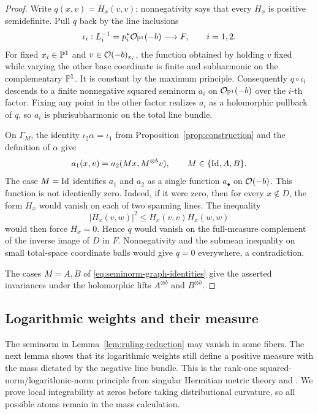 \begin{proof}
Write
$q(x,v)=H_x(v,v)$; nonnegativity says that every $H_x$ is positive
semidefinite.  Pull $q$ back by the line inclusions
\[
 \iota_i:L_i^{-1}=p_i^*\mathcal O_{\mathbb P^1}(-b)\longrightarrow F,
 \qquad i=1,2.
\]
For fixed $x_i\in\mathbb P^1$ and $v\in\mathcal O(-b)_{x_i}$, the function obtained
by holding $v$ fixed while varying the other base coordinate is finite
and subharmonic on the complementary $\mathbb P^1$.  It is constant by the
maximum principle.  Consequently $q\circ\iota_i$ descends to a finite
nonnegative squared seminorm $a_i$ on $\mathcal O_{\mathbb P^1}(-b)$ over the
$i$-th factor.  Fixing any point in the other factor realizes $a_i$ as a
holomorphic pullback of $q$, so $a_i$ is plurisubharmonic on the total
line bundle.

On $\Gamma_M$, the identity $\iota_2\alpha=\iota_1$ from
Proposition~\ref{prop:construction} and the definition of $\alpha$ give
\begin{equation}
 \label{eq:seminorm-graph-identities}
 a_1(x,v)=a_2(Mx,M^{\otimes b}v),
 \qquad M\in\{\operatorname{Id},A,B\}.
\end{equation}
The case $M=\operatorname{Id}$ identifies $a_1$ and $a_2$ as a single function
$a_\bullet$ on $\mathcal O(-b)$.  This function is not identically zero.
Indeed, if it were zero, then for every $x\notin D$, the form $H_x$
would vanish on each of two spanning lines.  The inequality
\[
 |H_x(v,w)|^2\leq H_x(v,v)H_x(w,w)
\]
would then force $H_x=0$.  Hence $q$ would vanish on the full-measure
complement of the inverse image of $D$ in $F$.  Nonnegativity and the
submean inequality on small total-space coordinate balls would give $q=0$
everywhere, a contradiction.

The cases $M=A,B$ of \eqref{eq:seminorm-graph-identities} give the
asserted invariances under the holomorphic lifts $A^{\otimes b}$ and
$B^{\otimes b}$.
\end{proof}

\subsection{Logarithmic weights and their measure}

The seminorm in Lemma~\ref{lem:ruling-reduction} may vanish in some
fibers. The next lemma shows that its logarithmic weights still define
a positive measure with the mass dictated by the negative line bundle.
This is the rank-one squared-norm/logarithmic-norm principle from
singular Hermitian metric theory
\cite[Section~3]{BerndtssonPaun2008} and
\cite[Definition~1.2 and Section~2]{Raufi2015}.
We prove local integrability at zeros before taking distributional
curvature, so all possible atoms remain in the mass calculation.


